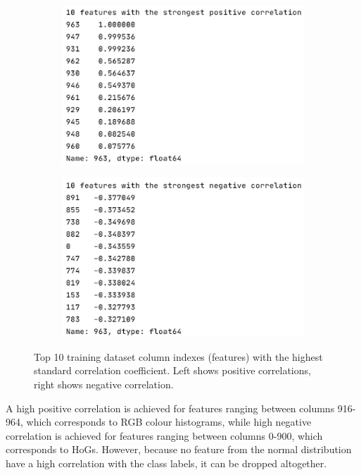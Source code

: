 \documentclass[letterpaper,12pt]{article}
\begin{document}
\begin{figure}[h]
\centering
\begin{subfigure}{.49\textwidth}
  \centering
  \includegraphics[width=\textwidth]{report/figures/corr_pos.png}
  \label{fig:corr_pos}
\end{subfigure}%
\begin{subfigure}{.5\textwidth}
  \centering
  \includegraphics[width=\textwidth]{report/figures/corr_neg.png}
  \label{fig:corr_neg}
\end{subfigure}
\caption{\label{fig:correlation-results}Top 10 training dataset column indexes (features) with the highest standard correlation coefficient. Left shows positive correlations, right shows negative correlation.}
\end{figure}

A high positive correlation is achieved for features ranging between columns 916-964, which corresponds to RGB colour histograms, while high negative correlation is achieved for features ranging between columns 0-900, which corresponds to HoGs. However, because no feature from the normal distribution have a high correlation  with the class labels, it can be dropped altogether.
\end{document}
